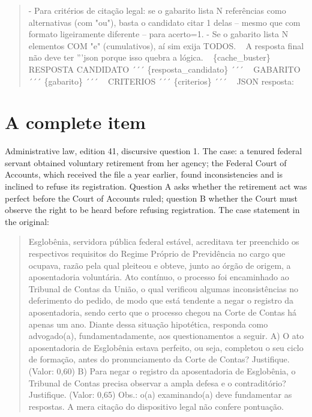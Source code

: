 \documentclass{IOS-Book-Article}
\begin{document}
\begin{quote}
- Para critérios de citação legal: se o gabarito lista N referências como alternativas (com "ou"), basta o candidato citar 1 delas -- mesmo que com formato ligeiramente diferente -- para acerto=1.\newline
- Se o gabarito lista N elementos COM "e" (cumulativos), aí sim exija TODOS.\newline
~\newline
A resposta final não deve ter '''json porque isso quebra a lógica.\newline
~\newline
\{cache\_buster\}\newline
~\newline
RESPOSTA CANDIDATO\newline
´´´ \{resposta\_candidato\} ´´´\newline
~\newline
GABARITO\newline
´´´ \{gabarito\} ´´´\newline
~\newline
CRITERIOS\newline
´´´ \{criterios\} ´´´\newline
~\newline
JSON resposta:
\end{quote}

\section{A complete item}

Administrative law, edition 41, discursive question 1. The case: a tenured federal servant obtained voluntary retirement from her agency; the Federal Court of Accounts, which received the file a year earlier, found inconsistencies and is inclined to refuse its registration. Question A asks whether the retirement act was perfect before the Court of Accounts ruled; question B whether the Court must observe the right to be heard before refusing registration. The case statement in the original:

\begin{quote}\footnotesize\ttfamily\raggedright
Esglobênia, servidora pública federal estável, acreditava ter preenchido os respectivos requisitos do Regime Próprio de Previdência no cargo que ocupava, razão pela qual pleiteou e obteve, junto ao órgão de origem, a aposentadoria voluntária. Ato contínuo, o processo foi encaminhado ao Tribunal de Contas da União, o qual verificou algumas inconsistências no deferimento do pedido, de modo que está tendente a negar o registro da aposentadoria, sendo certo que o processo chegou na Corte de Contas há apenas um ano. Diante dessa situação hipotética, responda como advogado(a), fundamentadamente, aos questionamentos a seguir. A) O ato aposentadoria de Esglobênia estava perfeito, ou seja, completou o seu ciclo de formação, antes do pronunciamento da Corte de Contas? Justifique. (Valor: 0,60) B) Para negar o registro da aposentadoria de Esglobênia, o Tribunal de Contas precisa observar a ampla defesa e o contraditório? Justifique. (Valor: 0,65) Obs.: o(a) examinando(a) deve fundamentar as respostas. A mera citação do dispositivo legal não confere pontuação.
\end{quote}
\end{document}
